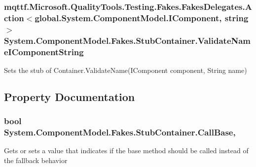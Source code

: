\hypertarget{class_system_1_1_component_model_1_1_fakes_1_1_stub_container_a00876c2ed3594534373704c3c89470d8}{
\subsubsection[{Validate\-Name\-I\-Component\-String}]{\setlength{\rightskip}{0pt plus 5cm}mqttf.\-Microsoft.\-Quality\-Tools.\-Testing.\-Fakes.\-Fakes\-Delegates.\-Action$<$global.\-System.\-Component\-Model.\-I\-Component, string$>$ System.\-Component\-Model.\-Fakes.\-Stub\-Container.\-Validate\-Name\-I\-Component\-String}}\label{class_system_1_1_component_model_1_1_fakes_1_1_stub_container_a00876c2ed3594534373704c3c89470d8}


Sets the stub of Container.\-Validate\-Name(\-I\-Component component, String name)



\subsection{Property Documentation}
\hypertarget{class_system_1_1_component_model_1_1_fakes_1_1_stub_container_a2f95b468857c1c143ce558c842fd6c5e}{
\subsubsection[{Call\-Base}]{\setlength{\rightskip}{0pt plus 5cm}bool System.\-Component\-Model.\-Fakes.\-Stub\-Container.\-Call\-Base\hspace{0.3cm}{\ttfamily [get]}, {\ttfamily [set]}}}\label{class_system_1_1_component_model_1_1_fakes_1_1_stub_container_a2f95b468857c1c143ce558c842fd6c5e}


Gets or sets a value that indicates if the base method should be called instead of the fallback behavior

